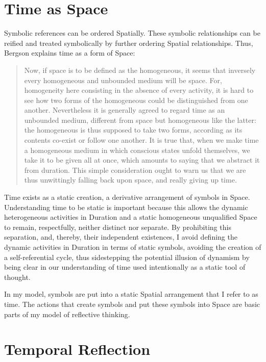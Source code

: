 \section{Time as Space}

Symbolic references can be ordered Spatially.  These symbolic
relationships can be reified and treated symbolically by further
ordering Spatial relationships.  Thus, Bergson explains time as a form
of Space:

\begin{quote}
Now, if space is to be defined as the homogeneous, it seems that
inversely every homogeneous and unbounded medium will be space.  For,
homogeneity here consisting in the absence of every activity, it is
hard to see how two forms of the homogeneous could be distinguished
from one another.  Nevertheless it is generally agreed to regard time
as an unbounded medium, different from space but homogeneous like the
latter: the homogeneous is thus supposed to take two forms, according
as its contents co-exist or follow one another.  It is true that, when
we make time a homogeneous medium in which conscious states unfold
themselves, we take it to be given all at once, which amounts to
saying that we abstract it from duration.  This simple consideration
ought to warn us that we are thus unwittingly falling back upon space,
and really giving up time.
\end{quote}

Time exists as a static creation, a derivative arrangement of symbols
in Space.  Understanding time to be static is important because this
allows the dynamic heterogeneous activities in Duration and a static
homogeneous unqualified Space to remain, respectfully, neither
distinct nor separate.  By prohibiting this separation, and, thereby,
their independent existences, I avoid defining the dynamic activities
in Duration in terms of static symbols, avoiding the creation of a
self-referential cycle, thus sidestepping the potential illusion of
dynamism by being clear in our understanding of time used
intentionally as a static tool of thought.

In my model, symbols are put into a static Spatial arrangement that I
refer to as time.  The actions that create symbols and put these
symbols into Space are basic parts of my model of reflective thinking.

\section{Temporal Reflection}

